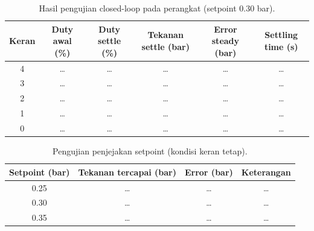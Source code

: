 \begin{table}[h]
  \centering
  \caption{Hasil pengujian closed-loop pada perangkat (setpoint 0.30 bar).}
  \label{tab:closedloop}
  \begin{tabular}{cccccc}
    \hline
    \textbf{Keran} & \textbf{Duty awal (\%)} & \textbf{Duty settle (\%)} &
    \textbf{Tekanan settle (bar)} & \textbf{Error steady (bar)} & \textbf{Settling time (s)} \\
    \hline
    4 & \dots & \dots & \dots & \dots & \dots \\
    3 & \dots & \dots & \dots & \dots & \dots \\
    2 & \dots & \dots & \dots & \dots & \dots \\
    1 & \dots & \dots & \dots & \dots & \dots \\
    0 & \dots & \dots & \dots & \dots & \dots \\
    \hline
  \end{tabular}
\end{table}

\begin{table}[h]
  \centering
  \caption{Pengujian penjejakan setpoint (kondisi keran tetap).}
  \label{tab:setpoint_tracking}
  \begin{tabular}{cccc}
    \hline
    \textbf{Setpoint (bar)} & \textbf{Tekanan tercapai (bar)} &
    \textbf{Error (bar)} & \textbf{Keterangan} \\
    \hline
    0.25 & \dots & \dots & \dots \\
    0.30 & \dots & \dots & \dots \\
    0.35 & \dots & \dots & \dots \\
    \hline
  \end{tabular}
\end{table}

